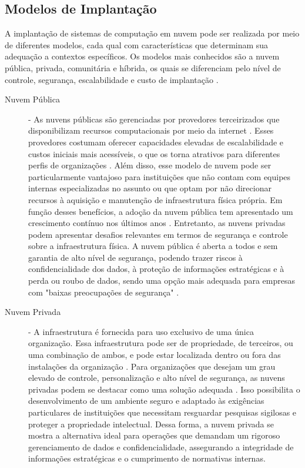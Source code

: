 \subsection{Modelos de Implantação}

A implantação de sistemas de computação em nuvem pode ser realizada por meio de diferentes modelos, cada qual com características que determinam sua adequação a contextos específicos. Os modelos mais conhecidos são a nuvem pública, privada, comunitária e híbrida, os quais se diferenciam pelo nível de controle, segurança, escalabilidade e custo de implantação \cite{mell2011}.

\begin{description}
    \item[Nuvem Pública] - As nuvens públicas são gerenciadas por provedores terceirizados que disponibilizam recursos computacionais por meio da internet \cite{carroll2011}. Esses provedores costumam oferecer capacidades elevadas de escalabilidade e custos iniciais mais acessíveis, o que os torna atrativos para diferentes perfis de organizações \cite{amajuoyi2024}. Além disso, esse modelo de nuvem pode ser particularmente vantajoso para instituições que não contam com equipes internas especializadas no assunto ou que optam por não direcionar recursos à aquisição e manutenção de infraestrutura física própria. Em função desses benefícios, a adoção da nuvem pública tem apresentado um crescimento contínuo nos últimos anos \cite{amajuoyi2024}. Entretanto, as nuvens privadas podem apresentar desafios relevantes em termos de segurança e controle sobre a infraestrutura física. A nuvem pública é aberta a todos e sem garantia de alto nível de segurança, podendo trazer riscos à confidencialidade dos dados, à proteção de informações estratégicas e à perda ou roubo de dados, sendo uma opção mais adequada para empresas com "baixas preocupações de segurança" \cite{sathya2023}.
    \item[Nuvem Privada] - A infraestrutura é fornecida para uso exclusivo de uma única organização. Essa infraestrutura pode ser de propriedade, de terceiros, ou uma combinação de ambos, e pode estar localizada dentro ou fora das instalações da organização \cite{mell2011}. Para organizações que desejam um grau elevado de controle, personalização e alto nível de segurança, as nuvens privadas podem se destacar como uma solução adequada \cite{swapna2023}. Isso possibilita o desenvolvimento de um ambiente seguro e adaptado às exigências particulares de instituições que necessitam resguardar pesquisas sigilosas e proteger a propriedade intelectual. Dessa forma, a nuvem privada se mostra a alternativa ideal para operações que demandam um rigoroso gerenciamento de dados e confidencialidade, assegurando a integridade de informações estratégicas e o cumprimento de normativas internas.

\end{description}
